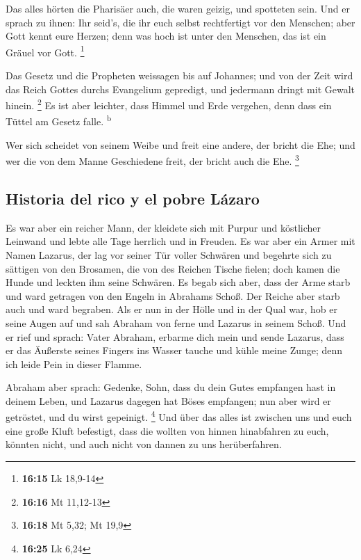  Das alles hörten die Pharisäer auch, die waren geizig,
und spotteten sein.  Und er sprach zu ihnen: Ihr seid's,
die ihr euch selbst rechtfertigt vor den Menschen; aber Gott kennt eure
Herzen; denn was hoch ist unter den Menschen, das ist ein Gräuel vor
Gott. \footnote{\textbf{16:15} Lk 18,9-14}

 Das Gesetz und die Propheten weissagen bis auf Johannes;
und von der Zeit wird das Reich Gottes durchs Evangelium gepredigt, und
jedermann dringt mit Gewalt hinein. \footnote{\textbf{16:16} Mt 11,12-13}
 Es ist aber leichter, dass Himmel und Erde vergehen,
denn dass ein Tüttel am Gesetz falle. \textsuperscript{b}

 Wer sich scheidet von seinem Weibe und freit eine
andere, der bricht die Ehe; und wer die von dem Manne Geschiedene freit,
der bricht auch die Ehe. \footnote{\textbf{16:18} Mt 5,32; Mt 19,9}

\hypertarget{historia-del-rico-y-el-pobre-luxe1zaro}{%
\subsection{Historia del rico y el pobre
Lázaro}\label{historia-del-rico-y-el-pobre-luxe1zaro}}

 Es war aber ein reicher Mann, der kleidete sich mit
Purpur und köstlicher Leinwand und lebte alle Tage herrlich und in
Freuden.  Es war aber ein Armer mit Namen Lazarus, der
lag vor seiner Tür voller Schwären  und begehrte sich zu
sättigen von den Brosamen, die von des Reichen Tische fielen; doch kamen
die Hunde und leckten ihm seine Schwären.  Es begab sich
aber, dass der Arme starb und ward getragen von den Engeln in Abrahams
Schoß. Der Reiche aber starb auch und ward begraben.  Als
er nun in der Hölle und in der Qual war, hob er seine Augen auf und sah
Abraham von ferne und Lazarus in seinem Schoß.  Und er
rief und sprach: Vater Abraham, erbarme dich mein und sende Lazarus,
dass er das Äußerste seines Fingers ins Wasser tauche und kühle meine
Zunge; denn ich leide Pein in dieser Flamme.

 Abraham aber sprach: Gedenke, Sohn, dass du dein Gutes
empfangen hast in deinem Leben, und Lazarus dagegen hat Böses empfangen;
nun aber wird er getröstet, und du wirst gepeinigt. \footnote{\textbf{16:25}
  Lk 6,24}  Und über das alles ist zwischen uns und euch
eine große Kluft befestigt, dass die wollten von hinnen hinabfahren zu
euch, könnten nicht, und auch nicht von dannen zu uns herüberfahren.

